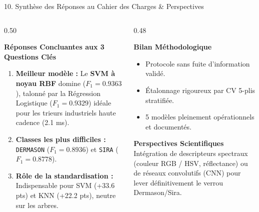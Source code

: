 \documentclass[aspectratio=169,10pt]{beamer}
\begin{document}
\begin{frame}{10. Synthèse des Réponses au Cahier des Charges \& Perspectives}
    \begin{columns}[T]
        \begin{column}{0.50\textwidth}
            \begin{block}{\textbf{Réponses Concluantes aux 3 Questions Clés}}
                \small
                \begin{enumerate}
                    \item \textbf{Meilleur modèle :} Le \textbf{SVM à noyau RBF} domine ($F_1 = \mathbf{0.9363}$), talonné par la Régression Logistique ($F_1 = 0.9329$) idéale pour les trieurs industriels haute cadence (2.1 ms).
                    \item \textbf{Classes les plus difficiles :} \texttt{DERMASON} ($F_1 = 0.8936$) et \texttt{SIRA} ($F_1 = 0.8778$).
                    \item \textbf{Rôle de la standardisation :} Indispensable pour SVM (+33.6 pts) et KNN (+22.2 pts), neutre sur les arbres.
                \end{enumerate}
            \end{block}
        \end{column}
        \begin{column}{0.48\textwidth}
            \begin{exampleblock}{\textbf{Bilan Méthodologique}}
                \footnotesize
                \begin{itemize}
                    \item Protocole sans fuite d'information validé.
                    \item Étalonnage rigoureux par CV 5-plis stratifiée.
                    \item 5 modèles pleinement opérationnels et documentés.
                \end{itemize}
            \end{exampleblock}
            \vspace{0.1cm}
            \begin{alertblock}{\textbf{Perspectives Scientifiques}}
                \footnotesize Intégration de descripteurs spectraux (couleur RGB / HSV, réflectance) ou de réseaux convolutifs (CNN) pour lever définitivement le verrou Dermason/Sira.

\end{alertblock}
\end{column}
\end{columns}
\end{frame}
\end{document}
